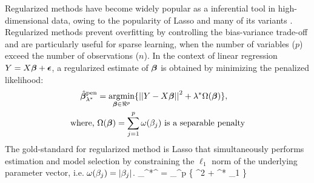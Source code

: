 \documentclass[12pt]{article}
\begin{document}
Regularized methods have become widely popular as a inferential tool in high-dimensional data, owing to the popularity of Lasso \citep{tibshirani96} and many of its variants \citep{tibshirani2014praise}. Regularized methods prevent overfitting by controlling the bias-variance trade-off and are particularly useful for sparse learning, when the number of variables ($p$) exceed the number of observations ($n$). In the context of linear regression $Y = X \boldsymbol{\beta} + \boldsymbol{\epsilon}$, a regularized estimate of $\boldsymbol{\beta}$ is obtained by minimizing the penalized likelihood:
\begin{align}
\hat{\bbeta}_{\lambda^*}^{\text{pen}} & = \argmin_{\bbeta \in \Re^p} \{ \vectornorm{Y - X\bbeta}^2 + \lambda^* \Omega(\bbeta) \}, \label{eq:penalize} \\
  \text{where, } & \Omega(\bbeta) = \sum_{j=1}^{p} \omega(\beta_j) \text{ is a separable penalty}
\end{align}
The gold-standard for regularized method is Lasso that simultaneously performs estimation and model selection by constraining the $\ell_1$ norm of the underlying parameter vector, i.e. $\omega(\beta_j) = \lvert\beta_j\rvert$. 
\beq
\hat{\bbeta}_{\lambda^*}^{} = \argmin_{\bbeta \in \Re^p} \{ ^2 + \lambda^* \norm{\bbeta}_1 \} \label{eq:lasso}
\eeq
\end{document}

